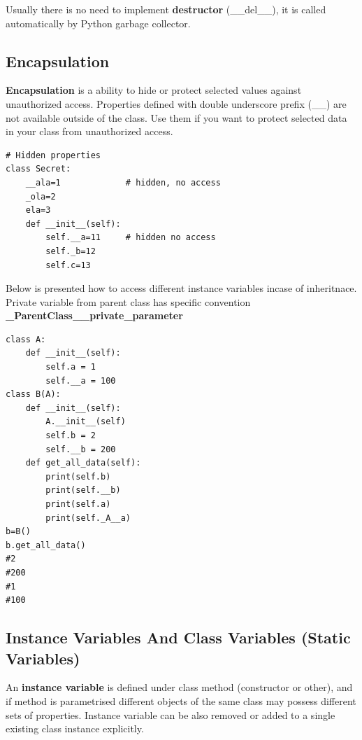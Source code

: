 \documentclass{article}
\begin{document}
Usually there is no need to implement \textbf{destructor} (\_\_del\_\_), it is called automatically by Python garbage collector.

\subsection{Encapsulation}
\textbf{Encapsulation} is a ability to hide or protect selected values against unauthorized access.
Properties defined with double underscore prefix (\_\_) are not available outside of the class. Use them if you want to protect selected data in your class from unauthorized access.
\begin{lstlisting}[style=pystyle]
# Hidden properties
class Secret:
    __ala=1				# hidden, no access
    _ola=2
    ela=3
    def __init__(self):
        self.__a=11		# hidden no access
        self._b=12
        self.c=13
\end{lstlisting}
Below is presented how to access different instance variables incase of inheritnace. Private variable from parent class has specific convention \textbf{\_ParentClass\_\_private\_parameter}

\begin{lstlisting}[style=pystyle]
class A:
    def __init__(self):
        self.a = 1
        self.__a = 100
class B(A):
    def __init__(self):
        A.__init__(self)
        self.b = 2
        self.__b = 200
    def get_all_data(self):
        print(self.b)
        print(self.__b)
        print(self.a)
        print(self._A__a)
b=B()
b.get_all_data()
#2
#200
#1
#100
\end{lstlisting}

\subsection{Instance Variables And Class Variables (Static Variables)}
An \textbf{instance variable} is defined under class method (constructor or other), and if method is parametrised different objects of the same class may possess different sets of properties. Instance variable can be also removed or added to a single existing class instance explicitly.
\end{document}
